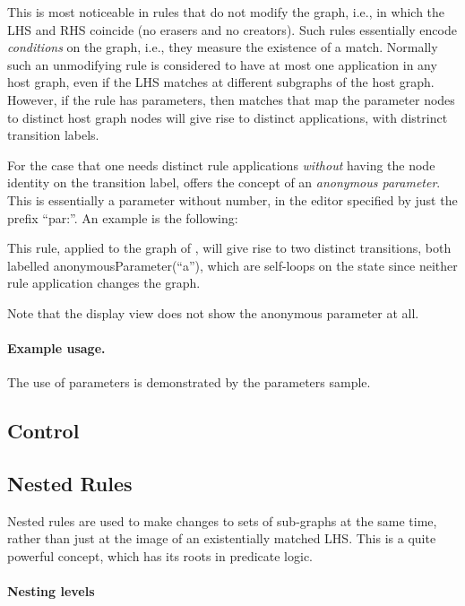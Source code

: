 This is most noticeable in rules that do not modify the graph, i.e., in which
the LHS and RHS coincide (no erasers and no creators). Such rules essentially
encode \emph{conditions} on the graph, i.e., they measure the existence of a
match. Normally such an unmodifying rule is considered to have at most one
application in any host graph, even if the LHS matches at different subgraphs of
the host graph. However, if the rule has parameters, then matches that map the
parameter nodes to distinct host graph nodes will give rise to distinct
applications, with distrinct transition labels.

For the case that one needs distinct rule applications \emph{without} having
the node identity on the transition label, \Groove{} offers the concept of an
\emph{anonymous parameter}. This is essentially a parameter without number, in
the editor specified by just the prefix ``\textsf{par:}''. An example is the
following:


This rule, applied to the graph of , will give rise to two
distinct transitions, both labelled \textsf{anonymousParameter(``a'')}, which
are self-loops on the state since neither rule application changes the graph.

Note that the display view does not show the anonymous parameter at all.

\paragraph{Example usage.}

The use of parameters is demonstrated by the \Groove \textsf{parameters}
sample.

\subsection{Control}


\subsection{Nested Rules}

Nested rules are used to make changes to sets of sub-graphs at the same time,
rather than just at the image of an existentially matched LHS. This is a quite
powerful concept, which has its roots in predicate logic.

\paragraph{Nesting levels}

